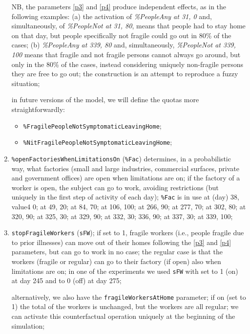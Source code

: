 \documentclass[graybox]{svmult}
\begin{document}
\begin{enumerate}[label=\roman*]
NB, the parameters \ref{p3} and \ref{p4} produce independent effects, as in the following examples: (a) the activation of \emph{\%PeopleAny at 31, 0} and, simultaneously, of \emph{\%PeopleNot at 31, 80}, means that people had to stay home on that day, but people specifically not fragile could go out in 80\% of the cases; (b) \emph{\%PeopleAny at 339, 80} and, simultaneously, \emph{\%PeopleNot at 339, 100} means that fragile and not fragile persons cannot always go around, but only in the 80\% of the cases, instead considering uniquely non-fragile persons they are free to go out; the construction is an attempt to reproduce a fuzzy situation;

in future versions of the model, we will define the quotas more straightforwardly:
\begin{itemize}
\item \verb|%FragilePeopleNotSymptomaticLeavingHome|;
\item \verb|%NitFragilePeopleNotSymptomaticLeavingHome|;
\end{itemize}

\item \label{p5} \verb|%openFactoriesWhenLimitationsOn| (\verb|%Fac|) 
determines, in a probabilistic way, what factories (small and large industries, commercial surfaces, private and government offices)
are open when limitations are on; if the factory of a worker is open, the subject can go to work, avoiding restrictions (but uniquely in the first step of activity of each day); \verb|%Fac| 
is in use at (day) 38, value4 0; at 49, 20; at 84, 70; at 106, 100; at 266, 90; at 277, 70; at 302, 80; at 320, 90; at 325, 30;
at 329, 90; at 332, 30; 336, 90; at 337, 30; at 339, 100;

\item \label{p6} \verb|stopFragileWorkers|  (\verb|sFW|); if set to 1, fragile workers (i.e., people fragile due to prior illnesses) can move out of their homes following the \ref{p3} and \ref{p4} parameters, but can go to work in no case; the regular case is that the workers (fragile or regular) can go to their factory (if open) also when limitations are on; in one of the experiments we used \verb|sFW| with set to 1 (on) at day 245  and to 0 (off) at day 275;

alternatively, we also have the \verb|fragileWorkersAtHome| parameter; if on (set to 1) the total of the workers is unchanged, but the workers are all regular; we can activate this counterfactual operation uniquely at the beginning of the simulation;


\end{enumerate}
\end{document}
